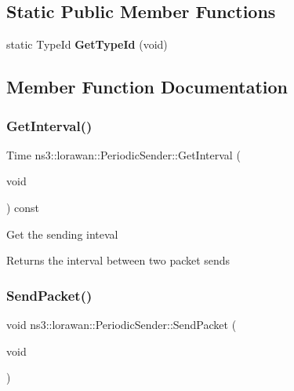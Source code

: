 \subsection*{Static Public Member Functions}
\begin{DoxyCompactItemize}
\item 
\mbox{\label{classns3_1_1lorawan_1_1PeriodicSender_a7c8a9c5064470e799d6702a54dd3a7f3}} 
static Type\+Id {\bfseries Get\+Type\+Id} (void)
\end{DoxyCompactItemize}


\subsection{Member Function Documentation}
\mbox{\label{classns3_1_1lorawan_1_1PeriodicSender_ada4dd99da2bf82acbaa9b3a02d6676a5}} 
\subsubsection{\texorpdfstring{Get\+Interval()}{GetInterval()}}
{\footnotesize\ttfamily Time ns3\+::lorawan\+::\+Periodic\+Sender\+::\+Get\+Interval (\begin{DoxyParamCaption}\item[{void}]{ }\end{DoxyParamCaption}) const}

Get the sending inteval \begin{DoxyReturn}{Returns}
the interval between two packet sends 
\end{DoxyReturn}
\mbox{\label{classns3_1_1lorawan_1_1PeriodicSender_ad231ee52170822429c49d736d6976db1}} 
\subsubsection{\texorpdfstring{Send\+Packet()}{SendPacket()}}
{\footnotesize\ttfamily void ns3\+::lorawan\+::\+Periodic\+Sender\+::\+Send\+Packet (\begin{DoxyParamCaption}\item[{void}]{ }\end{DoxyParamCaption})}

